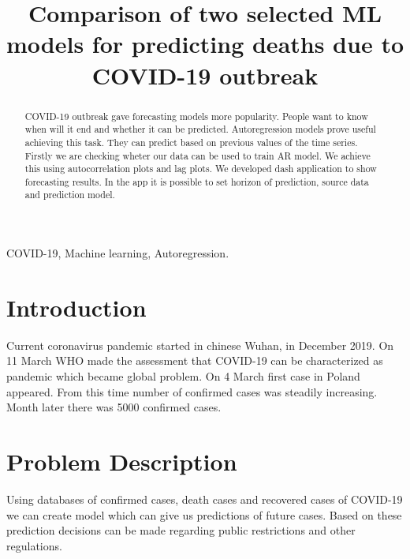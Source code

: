 \documentclass[conference]{IEEEtran}
\begin{document}
\title{Comparison of two selected ML models for predicting deaths due to COVID-19 outbreak}

\author{
\and
{}
}


\maketitle

\begin{abstract}
COVID-19 outbreak gave forecasting models more popularity. People want to know when will it end and whether it can be predicted.
Autoregression models prove useful achieving this task. They can predict based on previous values of the time series.
Firstly we are checking wheter our data can be used to train AR model. We achieve this using autocorrelation plots and lag plots.
We developed dash application to show forecasting results. In the app it is possible to set horizon of prediction, source data and prediction model.


\end{abstract}

\begin{IEEEkeywords}
COVID-19, Machine learning, Autoregression.
\end{IEEEkeywords}

\section{Introduction}
Current coronavirus pandemic started in chinese Wuhan, in December 2019. On 11 March WHO made the assessment that COVID-19 can be
 characterized as pandemic which became global problem. On 4 March first case in Poland appeared. From this time number of confirmed cases was steadily increasing.
 Month later there was 5000 confirmed cases.

\section{Problem Description}
Using databases of confirmed cases, death cases and recovered cases of COVID-19 we can create model which can give us predictions of future cases.
 Based on these prediction decisions can be made regarding public restrictions and other regulations.
\end{document}

